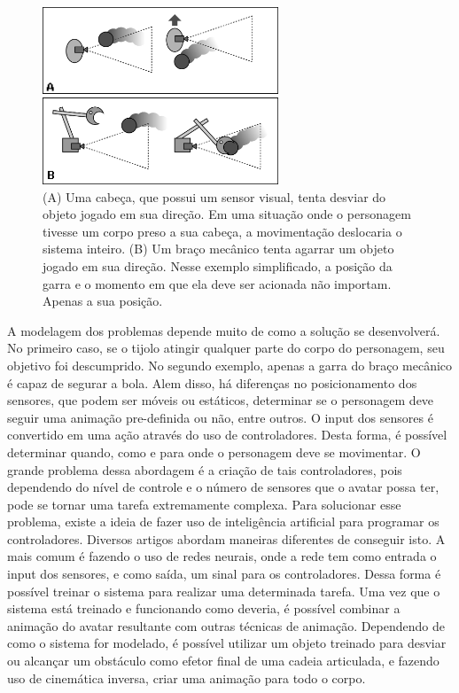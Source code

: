 \documentclass{article}
\begin{document}
\begin{figure}[ht]
  \centering
  \includegraphics[height=200px]{images/gancho_e_cabeca.png}
  \caption{(A) Uma cabeça, que possui um sensor visual, tenta desviar do objeto jogado em sua direção. Em uma situação onde o personagem tivesse um corpo preso a sua cabeça, a movimentação deslocaria o sistema inteiro. (B) Um braço mecânico tenta agarrar um objeto jogado em sua direção. Nesse exemplo simplificado, a posição da garra e o momento em que ela deve ser acionada não importam. Apenas a sua posição.}
  \label{fig:hookandhead}
\end{figure}
	
	A modelagem dos problemas depende muito de como a solução se desenvolverá. No primeiro caso, se o tijolo atingir qualquer parte do corpo do personagem, seu objetivo foi descumprido. No segundo exemplo, apenas a garra do braço mecânico é capaz de segurar a bola. Alem disso, há diferenças no posicionamento dos sensores, que podem ser móveis ou estáticos, determinar se o personagem deve seguir uma animação pre-definida ou não, entre outros.
O input dos sensores é convertido em uma ação através do uso de controladores. Desta forma, é possível determinar quando, como e para onde o personagem deve se movimentar. O grande problema dessa abordagem é a criação de tais controladores, pois dependendo do nível de controle e o número de sensores que o avatar possa ter, pode se tornar uma tarefa extremamente complexa.
Para solucionar esse problema, existe a ideia de fazer uso de inteligência artificial para programar os controladores. Diversos artigos abordam maneiras diferentes de conseguir isto. A mais comum é fazendo o uso de redes neurais, onde a rede tem como entrada o input dos sensores, e como saída, um sinal para os controladores. Dessa forma é possível treinar o sistema para realizar uma determinada tarefa.
Uma vez que o sistema está treinado e funcionando como deveria, é possível combinar a animação do avatar resultante com outras técnicas de animação. Dependendo de como o sistema for modelado, é possível utilizar um objeto treinado para desviar ou alcançar um obstáculo como efetor final de uma cadeia articulada, e fazendo uso de cinemática inversa, criar uma animação para todo o corpo.
\end{document}
